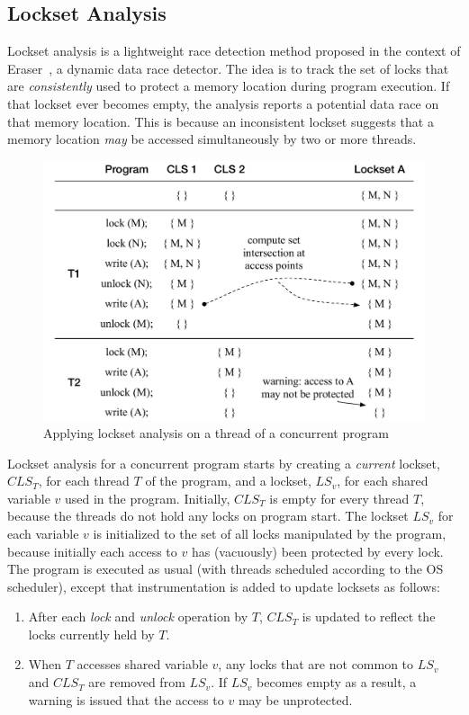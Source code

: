 \subsection{Lockset Analysis}
\label{bg:lockset}

Lockset analysis is a lightweight race detection method proposed in the context of Eraser~\cite{savage1997eraser}, a dynamic data race detector.  The idea is to track the set of locks that are \emph{consistently} used to protect a memory location during program execution. If that lockset ever becomes empty, the analysis reports a potential data race on that memory location. This is because an inconsistent lockset suggests that a memory location \emph{may} be accessed simultaneously by two or more threads.  

\begin{figure}[htbp]
\centering
\includegraphics[width=1\linewidth]{img/lockset.pdf}
\caption{Applying lockset analysis on a thread of a concurrent program}
\label{fig:locksets}
\end{figure}

Lockset analysis for a concurrent program starts by creating a \emph{current} lockset, $\mathit{CLS}_T$, for each thread $T$ of the program, and a lockset, $\mathit{LS}_v$, for each shared variable $v$ used in the program. Initially, $\mathit{CLS}_T$ is empty for every thread $T$, because the threads do not hold any locks on program start. The lockset $\mathit{LS}_v$ for each variable $v$ is initialized to the set of all locks manipulated by the program, because initially each access to $v$ has (vacuously) been protected by every lock. The program is executed as usual (with threads scheduled according to the OS scheduler), except that instrumentation is added to update locksets as follows:
%
\begin{enumerate}
\item After each \emph{lock} and \emph{unlock} operation by $T$, $\mathit{CLS}_T$ is updated to reflect the locks currently held by $T$.
\item When $T$ accesses shared variable $v$, any locks that are not common to $\mathit{LS}_v$ and $\mathit{CLS}_T$ are removed from $\mathit{LS}_v$.
If $\mathit{LS}_v$ becomes empty as a result, a warning is issued that the access to $v$ may be unprotected.
\end{enumerate}

